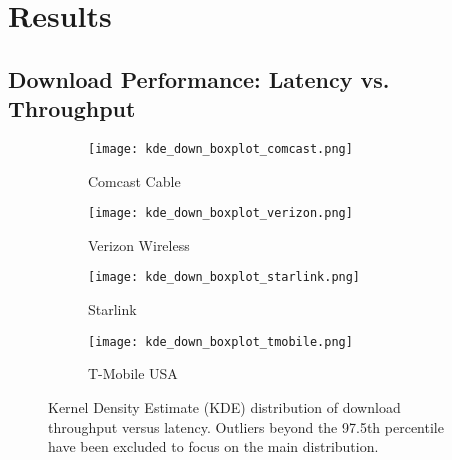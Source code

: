 \section{Results} \label{sec:results}

\subsection{Download Performance: Latency vs. Throughput}

\begin{figure}[H]
    \centering
    \begin{subfigure}{0.48\textwidth}
        \centering
        \texttt{[image: kde\_down\_boxplot\_comcast.png]}
        \caption{Comcast Cable}
    \end{subfigure}

    \begin{subfigure}{0.48\textwidth}
        \centering
        \texttt{[image: kde\_down\_boxplot\_verizon.png]}
        \caption{Verizon Wireless}
    \end{subfigure}
        
    \begin{subfigure}{0.48\textwidth}
        \centering
        \texttt{[image: kde\_down\_boxplot\_starlink.png]}
        \caption{Starlink}
    \end{subfigure}

    \begin{subfigure}{0.48\textwidth}
        \centering
        \texttt{[image: kde\_down\_boxplot\_tmobile.png]}
        \caption{T-Mobile USA}
    \end{subfigure}
    
    \caption{Kernel Density Estimate (KDE) distribution of download throughput versus latency. Outliers beyond the 97.5th percentile have been excluded to focus on the main distribution.}
    \label{fig:kde_download_throughput}
\end{figure}


